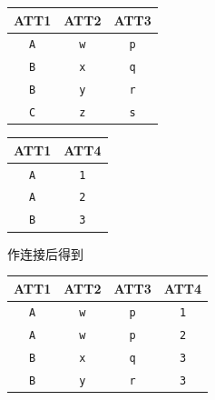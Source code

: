 \begin{center}
\begin{tabular}{c|c|c}
    \hline
    \hline
    ATT1    & ATT2 & ATT3 \\
    \hline
    \texttt{A}       & \texttt{w}    & \texttt{p}    \\
    \texttt{B}       & \texttt{x}    & \texttt{q}   \\
    \texttt{B}      & \texttt{y}    & \texttt{r}    \\
    \texttt{C}      & \texttt{z}    & \texttt{s}    \\
    \hline
\end{tabular}
\hspace{2em}
\begin{tabular}{c|c}
    \hline
    \hline
    ATT1    & ATT4 \\
    \hline
    \texttt{A}       & \texttt{1}   \\  
    \texttt{A}       & \texttt{2}   \\
    \texttt{B}      & \texttt{3}    \\
    \hline
\end{tabular}
\end{center}

\vspace{1em}
作连接后得到
\vspace{1em}

\begin{center}
\begin{tabular}{c|c|c|c}
    \hline
    \hline
    ATT1        & ATT2  & ATT3   &   ATT4   \\
    \hline
    \texttt{A}  & \texttt{w}    & \texttt{p} &  \texttt{1}  \\
    \texttt{A}  & \texttt{w}    & \texttt{p} &  \texttt{2}  \\
    \texttt{B}  & \texttt{x}    & \texttt{q} &  \texttt{3}  \\
    \texttt{B}  & \texttt{y}    & \texttt{r} &  \texttt{3}  \\
\end{tabular}
\end{center}
\vspace{1em}

